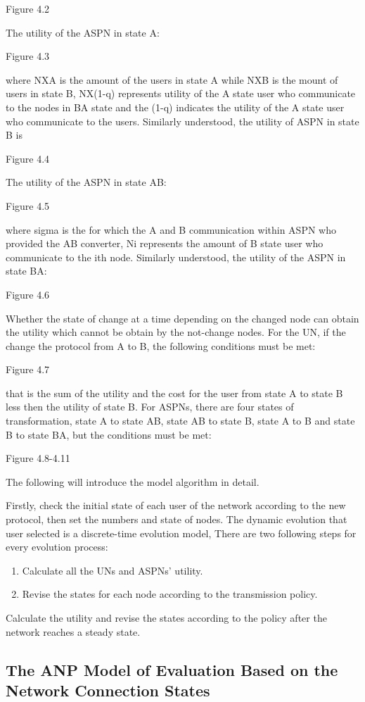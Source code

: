 \documentclass{article}
\begin{document}
Figure 4.2

The utility of the ASPN in state A:

Figure 4.3

where NXA is the amount of the users in state A while NXB is the mount  of users in state B, NX(1-q) represents  utility of
the A state user who communicate to the nodes in BA state and the (1-q) indicates the utility of the A state user who communicate
to the users. Similarly understood, the utility of ASPN in state B is

Figure 4.4

The utility of the ASPN in state AB:

Figure 4.5

where sigma is the for which the A and B  communication within ASPN who provided the AB converter, Ni represents
the amount of B state user who communicate to the ith node. Similarly understood, the utility of the ASPN in state BA:

Figure 4.6

Whether the state of change at a time depending on the changed node can obtain the utility which cannot be obtain
by the not-change nodes. For the UN, if the change the protocol from A to B, the following conditions must be met:

Figure 4.7

that is the sum of the utility  and the cost for the user from state A to state B less then the utility of state B.
For ASPNs, there are four states of transformation, state A to state AB, state AB to state B, state A to B and state B
to state BA, but the conditions must be met:

Figure 4.8-4.11

The following will introduce the model algorithm in detail.

Firstly, check the initial state of each user of the network according to the new protocol, then set the numbers and state
 of nodes. The dynamic evolution that user selected is a discrete-time evolution model, There are two following steps for
 every evolution process:
\begin{enumerate}
    \item Calculate all the UNs and ASPNs' utility.
    \item Revise the states for each node according to the transmission policy.
\end{enumerate}
   Calculate the utility and revise the states according to the policy after the network reaches a steady state.
\subsection{The ANP Model of Evaluation Based on the Network Connection States}
\end{document}

